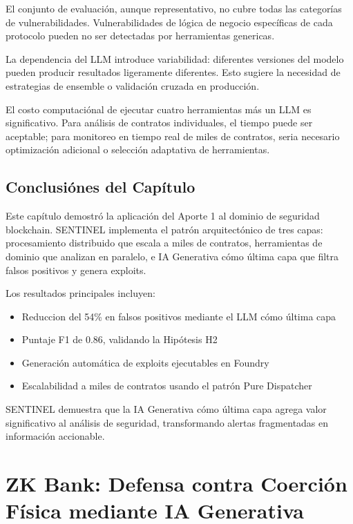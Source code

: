 \documentclass[12pt,a4paper,twoside]{book}
\begin{document}
El conjunto de evaluación, aunque representativo, no cubre todas las categorías de vulnerabilidades. Vulnerabilidades de lógica de negocio específicas de cada protocolo pueden no ser detectadas por herramientas genericas.

La dependencia del LLM introduce variabilidad: diferentes versiones del modelo pueden producir resultados ligeramente diferentes. Esto sugiere la necesidad de estrategias de ensemble o validación cruzada en producción.

El costo computaciónal de ejecutar cuatro herramientas más un LLM es significativo. Para análisis de contratos individuales, el tiempo puede ser aceptable; para monitoreo en tiempo real de miles de contratos, seria necesario optimización adicional o selección adaptativa de herramientas.

\section{Conclusiónes del Capítulo}

Este capítulo demostró la aplicación del Aporte 1 al dominio de seguridad blockchain. SENTINEL implementa el patrón arquitectónico de tres capas: procesamiento distribuido que escala a miles de contratos, herramientas de dominio que analizan en paralelo, e IA Generativa cómo última capa que filtra falsos positivos y genera exploits.

Los resultados principales incluyen:

\begin{itemize}
    \item Reduccion del 54\% en falsos positivos mediante el LLM cómo última capa
    \item Puntaje F1 de 0.86, validando la Hipótesis H2
    \item Generación automática de exploits ejecutables en Foundry
    \item Escalabilidad a miles de contratos usando el patrón Pure Dispatcher
\end{itemize}

SENTINEL demuestra que la IA Generativa cómo última capa agrega valor significativo al análisis de seguridad, transformando alertas fragmentadas en información accionable.

\chapter{ZK Bank: Defensa contra Coerción Física mediante IA Generativa}
\label{cap:zkbank}
\end{document}
